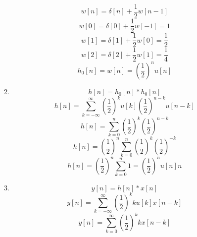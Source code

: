 \documentclass[10pt,a4paper, margin=1in]{article}
\begin{document}
\begin{enumerate}
\begin{enumerate}
        \begin{equation*}
            w[n] = \delta [n] + \frac{1}{2} w[n-1]
        \end{equation*}
        \begin{equation*}
            w[0] = \delta [0] + \frac{1}{2} w[-1] = 1
        \end{equation*}
        \begin{equation*}
            w[1] = \delta [1] + \frac{1}{2} w[0] = \frac{1}{2}
        \end{equation*}
        \begin{equation*}
            w[2] = \delta [2] + \frac{1}{2} w[1] = \frac{1}{4}
        \end{equation*}
        \begin{equation*}
            h_0[n] = w[n] = \left ( \frac{1}{2} \right )^n u[n]
        \end{equation*}
    \item %
        \begin{equation*}
            h[n] = h_0[n] * h_0[n]
        \end{equation*}
        \begin{equation*}
            h[n] = \sum_{k=-\infty}^{\infty} \left ( \frac{1}{2} \right )^k u[k] \left ( \frac{1}{2} \right )^{n-k} u[n-k]
        \end{equation*}
        \begin{equation*}
            h[n] = \sum_{k=0}^{n} \left ( \frac{1}{2} \right )^k \left ( \frac{1}{2} \right )^{n-k}
        \end{equation*}
        \begin{equation*}
            h[n] = \left ( \frac{1}{2} \right )^{n} \sum_{k=0}^{n} \left ( \frac{1}{2} \right )^k \left ( \frac{1}{2} \right )^{-k}
        \end{equation*}
        \begin{equation*}
            h[n] = \left ( \frac{1}{2} \right )^{n} \sum_{k=0}^{n} 1 = \left ( \frac{1}{2} \right )^{n}u[n]n
        \end{equation*}
	\item %
        \begin{equation*}
            y[n] = h[n] * x[n]
        \end{equation*}
        \begin{equation*}
            y[n] = \sum_{k=-\infty}^{\infty} \left ( \frac{1}{2} \right )^{k}ku[k]x[n-k]
        \end{equation*}
        \begin{equation*}
            y[n] = \sum_{k=0}^{\infty} \left ( \frac{1}{2} \right )^{k}kx[n-k]
        \end{equation*}
    \end{enumerate}
    

\end{enumerate}
\end{document}
